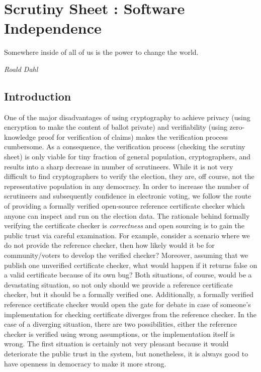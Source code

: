 \chapter{Scrutiny Sheet : Software Independence}
\label{cha:software_independence}
\setlength{\parindent}{2em}

\epigraph{Somewhere inside of all of us is the power to change the world.} 
{\textit{Roald Dahl }}

\section{Introduction}


One of the major disadvantages of using cryptography 
to achieve privacy (using encryption to make the 
content of ballot private)  and verifiability (using zero-knowledge proof for verification of claims) makes the verification 
process cumbersome. As a consequence, the verification process (checking the scrutiny sheet) is only viable for
tiny fraction of general population, cryptographers,  and results into a sharp decrease in number of scrutineers. 
While it is not very difficult to find cryptographers to verify the election, 
they are, off course, not the representative population in any democracy. 
In order to increase the number of scrutineers and subsequently confidence in electronic voting, we follow the 
route of providing a formally verified open-source 
reference certificate checker which anyone can inspect and run on the election data. 
  The rationale behind formally verifying the certificate checker is \emph{correctness}
  and open sourcing is to gain the public trust  via careful examination.  
  For example, consider a scenario where we do not provide the reference checker,
  then how 
  likely would it be for community/voters to develop the 
  verified checker? Moreover, assuming that we publish one unverified certificate checker,
  what would happen if it returns false on a valid certificate because of its own bug? 
  Both situations, of course, would be a devastating situation, so not only 
  should we provide a reference certificate checker, but it should be a formally verified one. 
  Additionally, a formally verified reference certificate checker would open the gate for
  debate in case of someone's implementation for checking certificate diverges from the reference checker.
In the case of a diverging situation, there are two possibilities, either the reference checker is verified 
using wrong assumptions,  or the implementation itself is wrong.  The first situation is certainly 
not very pleasant because it would deteriorate the public trust in the system, but nonetheless, it is always
good to  have openness in democracy to make it more strong. 
 


